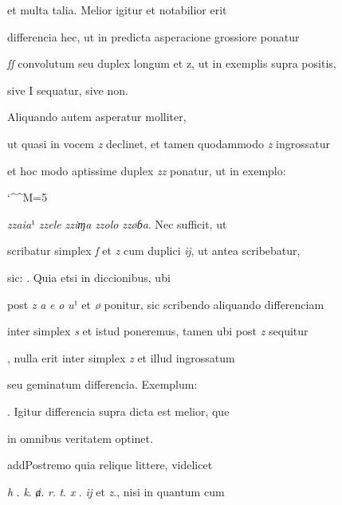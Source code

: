 et multa talia. Melior igitur et notabilior erit 

differencia hec, ut in predicta asperacione grossiore ponatur 

\textit{ſſ} convolutum seu duplex longum et z, ut in exemplis supra positis, 

\splitlines

sive I sequatur, sive non.

\indentK Aliquando autem asperatur molliter, 

\fulllines

ut quasi in vocem \textit{z} declinet, et tamen quodammodo \textit{z} ingrossatur 

et hoc modo aptissime duplex \textit{zz} ponatur, ut in exemplo: 

\catcode `\^^M=5
\obeylines

\textit{zzaia}¹ \textit{zzele} \textit{zziɱa} \textit{zzolo} \textit{zzøɓa}. Nec sufficit, ut 


scribatur simplex \textit{ſ} et \textit{z} cum duplici \textit{ĳ}, ut antea scribebatur, 

sic:  . Quia etsi in diccionibus, ubi 

post \textit{z} \textit{a} \textit{e} \textit{o} \textit{u}¹ et \textit{ø} ponitur, sic scribendo aliquando differenciam 

inter simplex \textit{s} et istud poneremus, tamen ubi post \textit{z} sequitur 

, nulla erit inter simplex \textit{z} et illud ingrossatum

seu geminatum differencia. Exemplum:   

. Igitur differencia 
supra dicta est melior, que 

in omnibus veritatem optinet. 

\indentP add{P}ostremo quia relique littere, videlicet 

\textit{h} . \textit{k}. \textit{ⱥ}. \textit{r}. \textit{t}. \textit{x} . \textit{ĳ} et \textit{z}., nisi in quantum cum 


